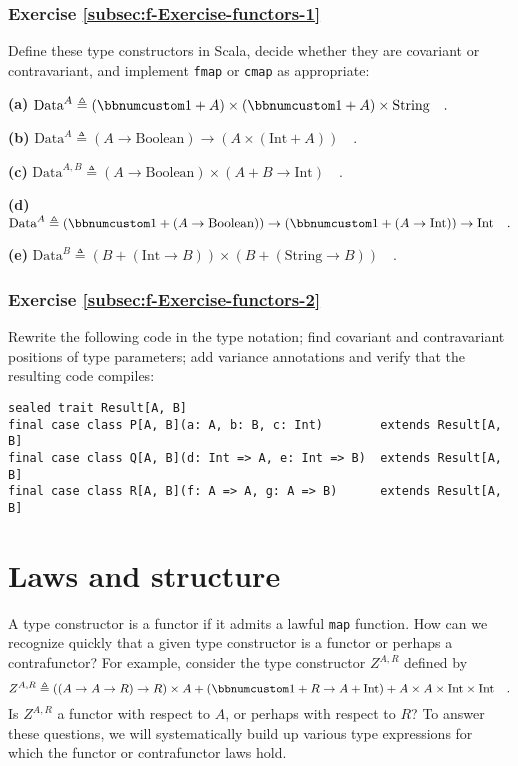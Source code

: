 \subsubsection{Exercise \label{subsec:f-Exercise-functors-1}\ref{subsec:f-Exercise-functors-1}}

Define these type constructors in Scala, decide whether they are covariant
or contravariant, and implement \lstinline!fmap! or \lstinline!cmap!
as appropriate:

\textbf{(a)} $\text{Data}^{A}\triangleq\left(\bbnum 1+A\right)\times\left(\bbnum 1+A\right)\times\text{String}\quad.$

\textbf{(b)} $\text{Data}^{A}\triangleq(A\rightarrow\text{Boolean})\rightarrow\left(A\times\left(\text{Int}+A\right)\right)\quad.$

\textbf{(c)} $\text{Data}^{A,B}\triangleq(A\rightarrow\text{Boolean})\times\left(A+B\rightarrow\text{Int}\right)\quad.$

\textbf{(d)} $\text{Data}^{A}\triangleq(\bbnum 1+(A\rightarrow\text{Boolean}))\rightarrow(\bbnum 1+(A\rightarrow\text{Int}))\rightarrow\text{Int}\quad.$

\textbf{(e)} $\text{Data}^{B}\triangleq(B+(\text{Int}\rightarrow B))\times(B+(\text{String}\rightarrow B))\quad.$

\subsubsection{Exercise \label{subsec:f-Exercise-functors-2}\ref{subsec:f-Exercise-functors-2}}

Rewrite the following code in the type notation; find covariant and
contravariant positions of type parameters; add variance annotations
and verify that the resulting code compiles:

\begin{lstlisting}
sealed trait Result[A, B]
final case class P[A, B](a: A, b: B, c: Int)        extends Result[A, B]
final case class Q[A, B](d: Int => A, e: Int => B)  extends Result[A, B]
final case class R[A, B](f: A => A, g: A => B)      extends Result[A, B]
\end{lstlisting}


\section{Laws and structure\label{sec:f-Laws-and-structure}}

A type constructor is a functor if it admits a lawful \lstinline!map!
function. How can we recognize quickly that a given type constructor
is a functor or perhaps a contrafunctor? For example, consider the
type constructor $Z^{A,R}$ defined by 
\begin{equation}
Z^{A,R}\triangleq\left(\left(A\rightarrow A\rightarrow R\right)\rightarrow R\right)\times A+\left(\bbnum 1+R\rightarrow A+\text{Int}\right)+A\times A\times\text{Int}\times\text{Int}\quad.\label{eq:f-example-complicated-z}
\end{equation}
Is $Z^{A,R}$ a functor with respect to $A$, or perhaps with respect
to $R$? To answer these questions, we will systematically build up
various type expressions for which the functor or contrafunctor laws
hold. 

